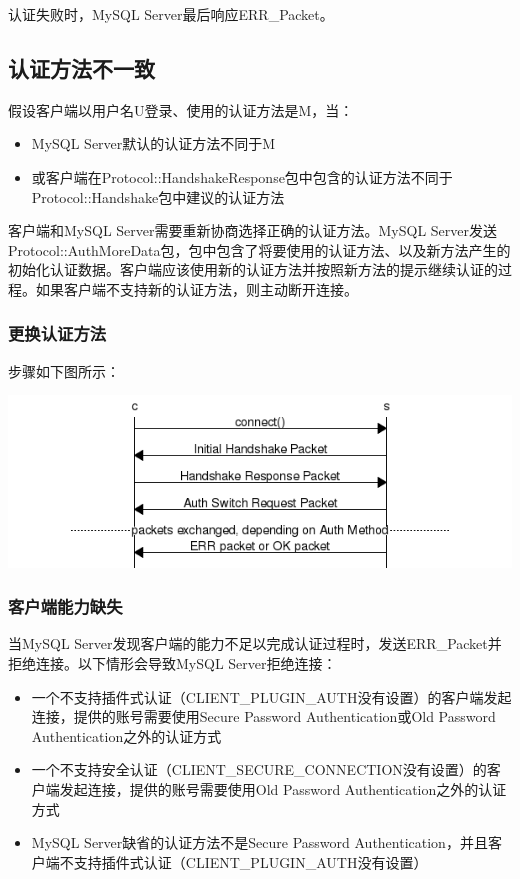 \documentclass[a4paper, titlepage, 10pt, bookmark]{article}
\begin{document}
认证失败时，MySQL Server最后响应ERR\_Packet。

\subsection{认证方法不一致}
假设客户端以用户名U登录、使用的认证方法是M，当：
\begin{itemize}
    \item MySQL Server默认的认证方法不同于M
    \item 或客户端在Protocol::HandshakeResponse包中包含的认证方法不同于Protocol::Handshake包中建议的认证方法
\end{itemize}

客户端和MySQL Server需要重新协商选择正确的认证方法。MySQL Server发送Protocol::AuthMoreData包，包中包含了将要使用的认证方法、以及新方法产生的初始化认证数据。客户端应该使用新的认证方法并按照新方法的提示继续认证的过程。如果客户端不支持新的认证方法，则主动断开连接。

\subsubsection{更换认证方法}
步骤如下图所示：
\begin{center}
\includegraphics[width=6in]{006.png}
\end{center}

\subsubsection{客户端能力缺失}
当MySQL Server发现客户端的能力不足以完成认证过程时，发送ERR\_Packet并拒绝连接。以下情形会导致MySQL Server拒绝连接：
\begin{itemize}
    \item 一个不支持插件式认证（CLIENT\_PLUGIN\_AUTH没有设置）的客户端发起连接，提供的账号需要使用Secure Password Authentication或Old Password Authentication之外的认证方式
    \item 一个不支持安全认证（CLIENT\_SECURE\_CONNECTION没有设置）的客户端发起连接，提供的账号需要使用Old Password Authentication之外的认证方式
    \item MySQL Server缺省的认证方法不是Secure Password Authentication，并且客户端不支持插件式认证（CLIENT\_PLUGIN\_AUTH没有设置）
\end{itemize}
\end{document}
